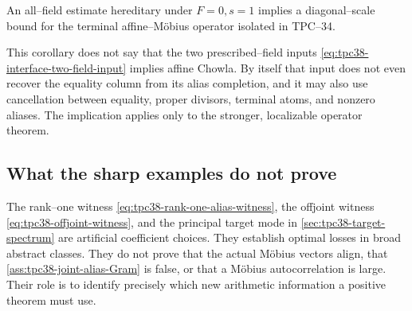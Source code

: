 \begin{corollary}
\label{cor:tpc38-terminal-hereditary-implication}
An all--field estimate hereditary under \(F=0,s=1\) implies a diagonal--scale
bound for the terminal affine--M\"obius operator isolated in TPC--34.
\end{corollary}

This corollary does not say that the two prescribed--field inputs
\eqref{eq:tpc38-interface-two-field-input} implies affine Chowla.  By
itself that input does not even recover the equality column from its alias
completion, and it may also use cancellation between equality, proper
divisors, terminal atoms, and nonzero aliases.  The implication applies
only to the stronger, localizable operator theorem.

\subsection{What the sharp examples do not prove}

The rank--one witness \eqref{eq:tpc38-rank-one-alias-witness}, the
offjoint witness \eqref{eq:tpc38-offjoint-witness}, and the principal target
mode in \cref{sec:tpc38-target-spectrum} are artificial coefficient
choices.  They establish optimal losses in broad abstract classes.  They
do not prove that the actual M\"obius vectors align, that
\cref{ass:tpc38-joint-alias-Gram} is false, or that a M\"obius
autocorrelation is large.  Their role is to identify precisely which new
arithmetic information a positive theorem must use.

